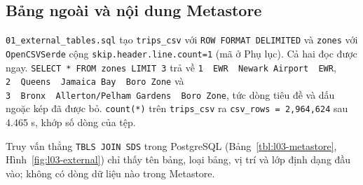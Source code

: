 \documentclass[
  12pt,
  a4paper,
]{report}
\begin{document}
\subsection{Bảng ngoài và nội dung
Metastore}\label{sec:l03-res-external}

\texttt{01\_}\allowbreak{}\texttt{external\_}\allowbreak{}\texttt{tables.}\allowbreak{}\texttt{sql}\allowbreak{}
tạo \texttt{trips\_csv} với \texttt{ROW\ FORMAT\ DELIMITED}\allowbreak{}
và \texttt{zones} với \texttt{OpenCSVSerde} cộng
\texttt{skip.}\allowbreak{}\texttt{header.}\allowbreak{}\texttt{line.}\allowbreak{}\texttt{count=}\allowbreak{}\texttt{1}\allowbreak{}
(mã ở Phụ lục). Cả hai đọc được ngay.
\texttt{SELECT\ *\ FROM\ zones\ LIMIT\ 3}\allowbreak{} trả về
\texttt{1\ \textbar{}\ EWR\ \textbar{}\ Newark\ Airport\ \textbar{}\ EWR}\allowbreak{},
\texttt{2\ \textbar{}\ Queens\ \textbar{}\ Jamaica\ Bay\ \textbar{}\ Boro\ Zone}\allowbreak{}
và
\texttt{3\ \textbar{}\ Bronx\ \textbar{}\ Allerton/}\allowbreak{}\texttt{Pelham\ Gardens\ \textbar{}\ Boro\ Zone}\allowbreak{},
tức dòng tiêu đề và dấu ngoặc kép đã được bỏ. \texttt{count(*)} trên
\texttt{trips\_csv} ra
\texttt{csv\_}\allowbreak{}\texttt{rows\ =}\allowbreak{}\texttt{\ 2,}\allowbreak{}\texttt{964,}\allowbreak{}\texttt{624}\allowbreak{}
sau 4.465 s, khớp số dòng của tệp.

Truy vấn thẳng \texttt{TBLS\ JOIN\ SDS} trong PostgreSQL
(Bảng~\ref{tbl:l03-metastore}, Hình~\ref{fig:l03-external}) chỉ thấy tên
bảng, loại bảng, vị trí và lớp định dạng đầu vào; không có dòng dữ liệu
nào trong Metastore.
\end{document}
